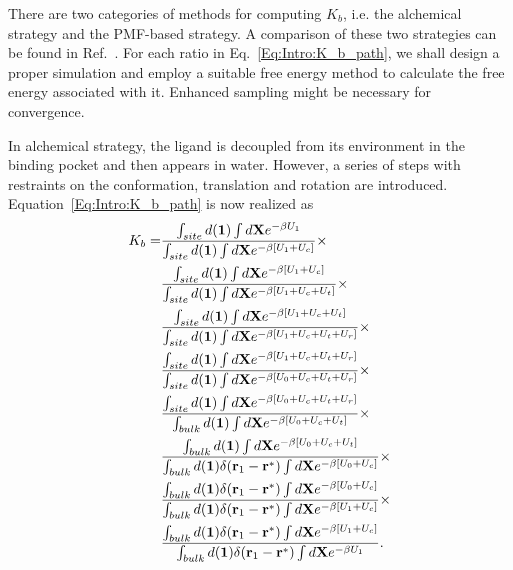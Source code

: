 There are two categories of methods for computing $K_b$, i.e. the alchemical strategy\cite{DengJCTC2006} and the PMF-based strategy\cite{WooPNAS2005}. A comparison of these two strategies can be found in Ref.~\cite{DengJPCB2009,GumbartJCTC2013}. For each ratio in Eq.~\ref{Eq:Intro:K_b_path}, we shall design a proper simulation and employ a suitable free energy method to calculate the free energy associated with it. Enhanced sampling might be necessary for convergence.

In alchemical strategy, the ligand is decoupled from its environment in the binding pocket and then appears in water. However, a series of steps with restraints on the conformation, translation and rotation are introduced. Equation~\ref{Eq:Intro:K_b_path} is now realized as
\begin{align}
  K_b=&\frac{\int_{site}d(\mathbf{1})\int d\mathbf{X}e^{-\beta U_1}}{\int_{site}d(\mathbf{1})\int d\mathbf{X}e^{-\beta [U_1+U_c]}}\times\notag\\
      &\frac{\int_{site}d(\mathbf{1})\int d\mathbf{X}e^{-\beta [U_1+U_c]}}{\int_{site}d(\mathbf{1})\int d\mathbf{X}e^{-\beta [U_1+U_c+U_t]}}\times\notag\\
      &\frac{\int_{site}d(\mathbf{1})\int d\mathbf{X}e^{-\beta [U_1+U_c+U_t]}}{\int_{site}d(\mathbf{1})\int d\mathbf{X}e^{-\beta [U_1+U_c+U_t+U_r]}}\times\notag\\
      &\frac{\int_{site}d(\mathbf{1})\int d\mathbf{X}e^{-\beta [U_1+U_c+U_t+U_r]}}{\int_{site}d(\mathbf{1})\int d\mathbf{X}e^{-\beta [U_0+U_c+U_t+U_r]}}\times\notag\\
      &\frac{\int_{site}d(\mathbf{1})\int d\mathbf{X}e^{-\beta [U_0+U_c+U_t+U_r]}}{\int_{bulk}d(\mathbf{1})\int d\mathbf{X}e^{-\beta [U_0+U_c+U_t]}}\times\notag\\
      &\frac{\int_{bulk}d(\mathbf{1})\int d\mathbf{X}e^{-\beta [U_0+U_c+U_t]}}{\int_{bulk}d(\mathbf{1})\delta(\mathbf{r}_1-\mathbf{r}^*)\int d\mathbf{X}e^{-\beta [U_0+U_c]}}\times\notag\\
      &\frac{\int_{bulk}d(\mathbf{1})\delta(\mathbf{r}_1-\mathbf{r}^*)\int d\mathbf{X}e^{-\beta [U_0+U_c]}}{\int_{bulk}d(\mathbf{1})\delta(\mathbf{r}_1-\mathbf{r}^*)\int d\mathbf{X}e^{-\beta [U_1+U_c]}}\times\notag\\
      &\frac{\int_{bulk}d(\mathbf{1})\delta(\mathbf{r}_1-\mathbf{r}^*)\int d\mathbf{X}e^{-\beta [U_1+U_c]}}{\int_{bulk}d(\mathbf{1})\delta(\mathbf{r}_1-\mathbf{r}^*)\int d\mathbf{X}e^{-\beta U_1}}.
\end{align}

